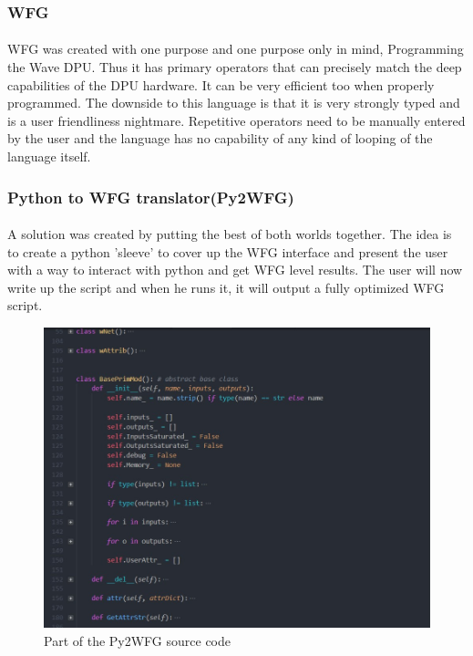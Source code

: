 \subsubsection*{WFG}
\paragraph{}
WFG was created with one purpose and one purpose only in mind, Programming the Wave DPU. Thus it has primary operators that can precisely match the deep capabilities of the DPU hardware. It can be very efficient too when properly programmed. The downside to this language is that it is very strongly typed and is a user friendliness nightmare. Repetitive operators need to be manually entered by the user and the language has no capability of any kind of looping of the language itself.

\subsubsection{Python to WFG translator(Py2WFG)}
\paragraph{}
A solution was created by putting the best of both worlds together. The idea is to create a python 'sleeve' to cover up the WFG interface and present the user with a way to interact with python and get WFG level results. The user will now write up the script and when he runs it, it will output a fully optimized WFG script. 

\begin{figure}[H]
    \centering
    \includegraphics[trim=0cm 0cm 0cm 0cm, clip=true,scale=0.6]{figures/py2wfg_src.jpg}
    \caption{Part of the Py2WFG source code\label{Fig:py2src}}\vspace{-4mm}
    \end{figure}

